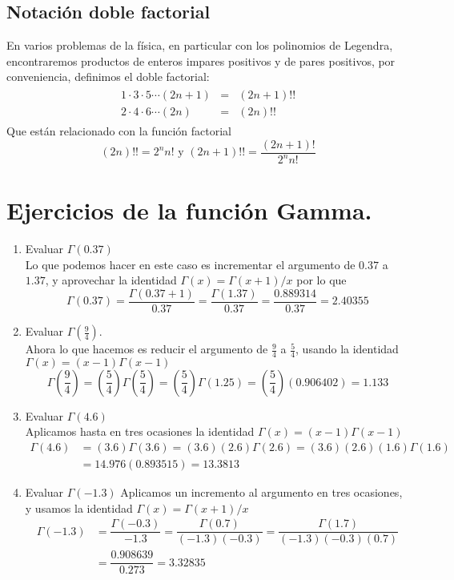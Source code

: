\subsection{Notación doble factorial}
En varios problemas de la física, en particular con los polinomios de Legendra, encontraremos productos de enteros impares positivos y de pares positivos, por conveniencia, definimos el doble factorial:
\begin{eqnarray}
\begin{aligned}
1 \cdot 3 \cdot 5 \cdots (2n+1) &=& (2n+1) !! \\
2 \cdot 4 \cdot 6 \cdots (2n) &=& (2n) !!
\end{aligned}
\end{eqnarray}
Que están relacionado con la función factorial
\begin{equation}
(2n)!! =  2^{n} n! \text{ y } (2n+1)!! = \dfrac{(2n+1)!}{2^{n}n!}
\end{equation}
\section{Ejercicios de la función Gamma.}
\begin{enumerate}
\item Evaluar $\Gamma(0.37)$
\\
Lo que podemos hacer en este caso es incrementar el argumento de $0.37$ a $1.37$, y aprovechar la identidad $\Gamma(x) = \Gamma(x+1)/x$ por lo que
\[ \Gamma(0.37) = \dfrac{\Gamma(0.37 + 1)}{0.37} = \dfrac{\Gamma(1.37)}{0.37} =\dfrac{0.889314}{0.37} = 2.40355 \]
\item Evaluar $\Gamma(\frac{9}{4})$.
\\
Ahora lo que hacemos es reducir el argumento de $\frac{9}{4}$ a $\frac{5}{4}$, usando la identidad $\Gamma(x) = (x-1) \Gamma(x-1)$
\[ \Gamma \left( \dfrac{9}{4} \right) = \left( \dfrac{5}{4} \right) \Gamma \left( \dfrac{5}{4} \right) = \left( \dfrac{5}{4} \right) \Gamma(1.25) = \left( \dfrac{5}{4} \right) (0.906402) = 1.133 \]
\item Evaluar $\Gamma(4.6)$
\\
Aplicamos hasta en tres ocasiones la identidad $\Gamma(x) = (x-1) \Gamma(x-1)$
\[ \begin{split}
\Gamma(4.6) &= (3.6) \Gamma(3.6) = (3.6) (2.6) \Gamma(2.6) = (3.6)(2.6)(1.6) \Gamma(1.6) \\
&= 14.976 (0.893515) = 13.3813
\end{split} \]
\item Evaluar $\Gamma(-1.3)$
Aplicamos un incremento al argumento en tres ocasiones, y usamos la identidad $\Gamma(x)= \Gamma(x+1) /x$
\[ \begin{split}
\Gamma(-1.3) &= \dfrac{\Gamma(-0.3)}{-1.3} = \dfrac{\Gamma(0.7)}{(-1.3)(-0.3)} = \dfrac{\Gamma(1.7)}{(-1.3)(-0.3)(0.7)} \\
&= \dfrac{0.908639}{0.273} = 3.32835
\end{split} \]
\end{enumerate}
